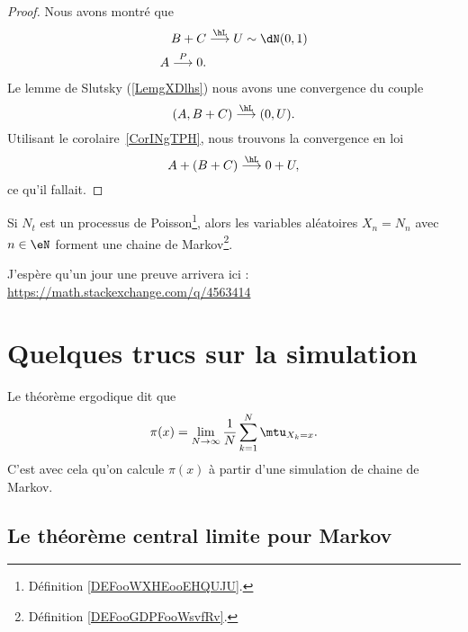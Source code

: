 \begin{proof}
	Nous avons montré que
	\begin{subequations}
		\begin{align}
			B+C & \stackrel{\hL}{\longrightarrow} U\sim\dN(0,1) \\
			A\stackrel{P}{\longrightarrow}0.
		\end{align}
	\end{subequations}
	Le lemme de Slutsky (\ref{LemgXDlhs}) nous avons une convergence du couple
	\begin{equation}
		(A,B+C)\stackrel{\hL}{\longrightarrow}(0,U).
	\end{equation}
	Utilisant le corolaire~\ref{CorINgTPH}, nous trouvons la convergence en loi
	\begin{equation}
		A+(B+C)\stackrel{\hL}{\longrightarrow}0+U,
	\end{equation}
	ce qu'il fallait.
\end{proof}

\begin{proposition}     \label{PROPooWAVPooHDVsER}
	Si \( N_t\) est un processus de Poisson\footnote{Définition \ref{DEFooWXHEooEHQUJU}.}, alors les variables aléatoires \( X_n=N_n\) avec \( n\in \eN\) forment une chaine de Markov\footnote{Définition \ref{DEFooGDPFooWsvfRv}.}.
\end{proposition}
J'espère qu'un jour une preuve arrivera ici : \url{https://math.stackexchange.com/q/4563414}

\section{Quelques trucs sur la simulation}

Le théorème ergodique dit que
\begin{equation}
	\pi(x)=\lim_{N\to \infty} \frac{1}{ N }\sum_{k=1}^N\mtu_{X_k=x}.
\end{equation}
C'est avec cela qu'on calcule \( \pi(x)\) à partir d'une simulation de chaine de Markov.

\subsection{Le théorème central limite pour Markov}

